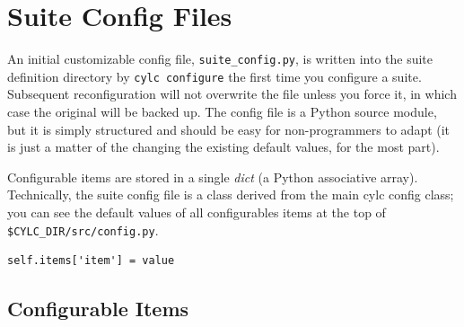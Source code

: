 \documentclass[11pt,a4paper]{article}
\begin{document}
\pagebreak
\section{Suite Config Files}
\label{SuiteConfigFiles}

An initial customizable config file, \lstinline=suite_config.py=, is
written into the suite definition directory by 
\lstinline=cylc configure= the first time you configure a suite.
Subsequent reconfiguration will not overwrite the file unless you force
it, in which case the original will be backed up. The config file is a
Python source module, but it is simply structured and should be easy for
non-programmers to adapt (it is just a matter of the changing the
existing default values, for the most part). 

Configurable items are stored in a single {\em dict} (a Python
associative array). Technically, the suite config file is a class
derived from the main cylc config class; you can see the default
values of all configurables items at the top of
\lstinline=$CYLC_DIR/src/config.py=.

\lstset{language=Python}
\begin{lstlisting}
self.items['item'] = value
\end{lstlisting}

\subsection{Configurable Items}
\label{ConfigurableItems}
\end{document}
